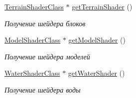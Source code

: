 \begin{DoxyCompactItemize}
\hyperlink{class_terrain_shader_class}{Terrain\+Shader\+Class} $\ast$ \hyperlink{class_shader_manager_class_a55c6138987f24dd93b3173b5a789bfb8}{get\+Terrain\+Shader} ()
\begin{DoxyCompactList}\small\item\em Получение шейдера блоков \end{DoxyCompactList}\item 
\hyperlink{class_model_shader_class}{Model\+Shader\+Class} $\ast$ \hyperlink{class_shader_manager_class_a3d029bf8f178ee3fce2eb41e0fdd1ca5}{get\+Model\+Shader} ()
\begin{DoxyCompactList}\small\item\em Получение шейдера моделей \end{DoxyCompactList}\item 
\hyperlink{class_water_shader_class}{Water\+Shader\+Class} $\ast$ \hyperlink{class_shader_manager_class_a58ba38e8abececb2aeee26b66cb67f03}{get\+Water\+Shader} ()
\begin{DoxyCompactList}\small\item\em Получение шейдера воды \end{DoxyCompactList}\end{DoxyCompactItemize}
